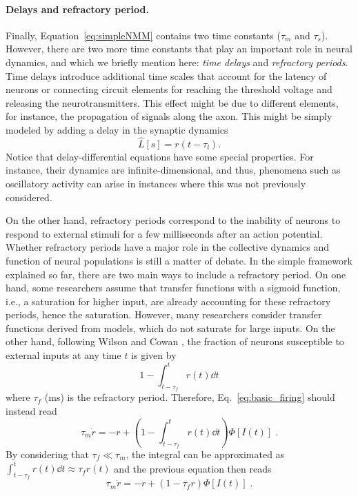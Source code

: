 \documentclass[12pt]{article}
\numberwithin{equation}{section}
\begin{document}
\paragraph{Delays and refractory period.} Finally, Equation~\eqref{eq:simpleNMM} contains two time constants ($\tau_m$ and $\tau_s$).
However, there are two more time constants that play an important role in neural dynamics, and which we briefly mention here: 
 \textit{time delays} and \textit{refractory periods}.
Time delays introduce additional time scales that account for the latency of neurons or connecting circuit elements
for reaching the threshold voltage and releasing the neurotransmitters.
This effect might be due to different elements, for instance, the propagation of signals along the axon.
This might be simply modeled by adding a delay in the synaptic dynamics
\begin{equation}
\hat L[s]  =  r(t-\tau_l).
 \end{equation}
Notice that delay-differential equations have some special properties.
For instance, their dynamics are infinite-dimensional, and thus, phenomena such as
oscillatory activity can arise in instances where this was not previously considered.

On the other hand, refractory periods correspond to the inability of neurons to respond
to external stimuli for a few milliseconds after an action potential.
Whether refractory periods have a major role in the collective dynamics and function of neural populations is still a matter of debate.
In the simple framework explained so far, there are two main ways to include a refractory period.
On one hand, some researchers assume that transfer functions with a sigmoid function, i.e., a saturation for higher input, are already accounting for these refractory periods, hence the saturation.
However, many researchers consider transfer functions derived from models, which do not saturate for large inputs.
On the other hand, following Wilson and Cowan \cite{wilson_excitatory_1972}, the fraction of neurons susceptible to external inputs
at any time $t$ is given by
\begin{equation}
    1-\int_{t-\tau_f}^t r(t) \dd t
\end{equation}
where $\tau_f$ (ms) is the refractory period.
Therefore, Eq.~\eqref{eq:basic_firing} should instead read
\begin{equation}
    \tau_m \dot r = -r + \left(1-\int_{t-\tau_{f}}^t r(t) \dd t\right)\Phi[ I(t) ]\;.
\end{equation}
By considering that $\tau_{f}\ll \tau_m$, the integral can be approximated 
as $\int_{t-\tau_{f}}^t r(t) \dd t\approx \tau_{f} r(t)$ and the previous equation then reads
\begin{equation}
    \tau_m \dot r = -r + \left(1-\tau_{f}r\right)\Phi[ I(t) ]\;.
\end{equation}
\end{document}
